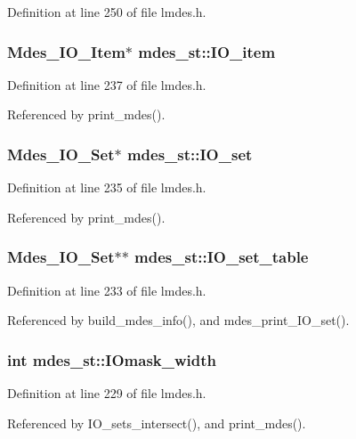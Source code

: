 Definition at line 250 of file lmdes.h.
\subsubsection{\setlength{\rightskip}{0pt plus 5cm}\bf{Mdes\_\-IO\_\-Item}$\ast$ \bf{mdes\_\-st::IO\_\-item}}\label{structmdes__st_681219453a7b2032a138b331ba4fb6ae}




Definition at line 237 of file lmdes.h.

Referenced by print\_\-mdes().
\subsubsection{\setlength{\rightskip}{0pt plus 5cm}\bf{Mdes\_\-IO\_\-Set}$\ast$ \bf{mdes\_\-st::IO\_\-set}}\label{structmdes__st_038cc6be3823730b778c09e48376feb0}




Definition at line 235 of file lmdes.h.

Referenced by print\_\-mdes().
\subsubsection{\setlength{\rightskip}{0pt plus 5cm}\bf{Mdes\_\-IO\_\-Set}$\ast$$\ast$ \bf{mdes\_\-st::IO\_\-set\_\-table}}\label{structmdes__st_03c2f265d0bb249445f6b63e2c7f4bfc}




Definition at line 233 of file lmdes.h.

Referenced by build\_\-mdes\_\-info(), and mdes\_\-print\_\-IO\_\-set().
\subsubsection{\setlength{\rightskip}{0pt plus 5cm}int \bf{mdes\_\-st::IOmask\_\-width}}\label{structmdes__st_29fc136d2dc0f414380fc59b235ee727}




Definition at line 229 of file lmdes.h.

Referenced by IO\_\-sets\_\-intersect(), and print\_\-mdes().
